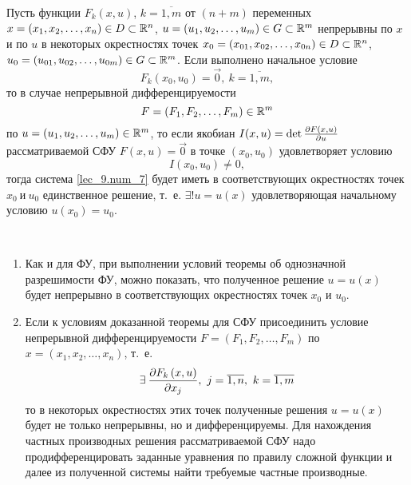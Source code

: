 \documentclass[../main.tex]{subfiles}
\begin{document}
\begin{thm}
Пусть функции $F_k\left(x, u\right)$, $k = \overline{1, m}$
от $(n+ m)$ переменных 
$x = \left(x_1, x_2, \dots, x_n\right) \in D \subset \mathbb{R}^n$,
$u = \left(u_1, u_2, \dots, u_m\right) \in G \subset \mathbb{R}^m$
непрерывны по $x$ и по $u$ в некоторых окрестностях точек
$x_0 = \left(x_{01}, x_{02}, \dots, x_{0n}\right) \in D 
\subset \mathbb{R}^n$,
$u_0 = \left(u_{01}, u_{02}, \dots, u_{0m}\right) \in G
\subset \mathbb{R}^m$. Если выполнено начальное условие
\begin{equation}
    \label{lec_9.num_12}
    F_k(x_0, u_0) = \vec{0},\ k = \overline{1, m},
\end{equation}
то в случае непрерывной дифференцируемости
\begin{equation}
    \label{lec_9.num_13}
    F = \left(F_1, F_2, \dots, F_m\right) \in \mathbb{R}^m
\end{equation}
по $u = \left(u_1, u_2, \dots, u_m\right) \in \mathbb{R}^m$,
то если якобиан
$I(x, u) = \det\frac{\partial F\left(x, u\right)}{\partial u}$
рассматриваемой СФУ $F\left(x, u\right) = \vec{0}$
в точке $\left(x_0, u_0\right)$ удовлетворяет условию
\begin{equation}
    \label{lec_9.num_14}
    I(x_0, u_0) \neq 0,
\end{equation}
тогда система \eqref{lec_9.num_7} будет иметь в 
соответствующих окрестностях точек $x_0\ \text{и}\ u_0$
единственное решение, т.~е. $\exists!u = u(x)$ удовлетворяющая начальному
 условию $u(x_0) = u_0$.
\end{thm}
\begin{rems}

~

    \begin{enumerate}
        \item Как и для ФУ, при выполнении условий 
        теоремы об однозначной разрешимости ФУ, можно показать,
        что полученное решение $u = u\left(x\right)$
        будет непрерывно в соответствующих окрестностях
        точек $x_0$ и $u_0$.
        \item Если к условиям доказанной теоремы для
        СФУ присоединить условие непрерывной 
        дифференцируемости
        $F = \left(F_1, F_2, \dots, F_m\right)$ по
        $x = \left(x_1, x_2, \dots, x_n\right)$, т.~е. 
        \[\exists\:
        \pderiv{F_k\left(x, u\right)}{x_j},\ 
        j = \overline{1, n},\ k = \overline{1, m}\] то в некоторых окрестностях
        этих точек полученные решения 
        $u = u\left(x\right)$ будет не только 
        непрерывны, но и дифференцируемы.
        Для нахождения частных производных решения
        рассматриваемой СФУ надо продифференцировать
        заданные уравнения по правилу сложной функции и
        далее из полученной системы найти требуемые частные производные. 
    \end{enumerate}
\end{rems}
\end{document}
